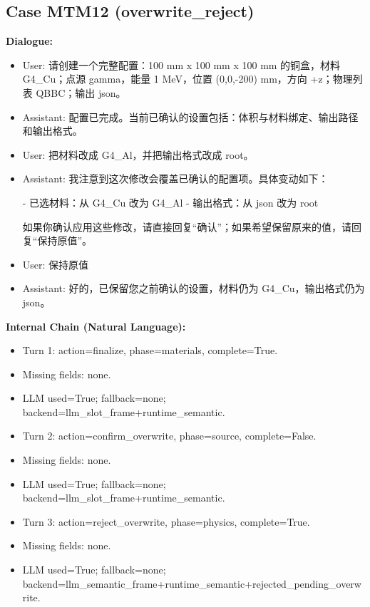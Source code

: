 \documentclass[11pt]{ctexart}
\begin{document}
\subsection{Case MTM12 (overwrite\_reject)}
\textbf{Dialogue:}
\begin{itemize}
\item User: 请创建一个完整配置：100 mm x 100 mm x 100 mm 的铜盒，材料 G4\_Cu；点源 gamma，能量 1 MeV，位置 (0,0,-200) mm，方向 +z；物理列表 QBBC；输出 json。
\item Assistant: 配置已完成。当前已确认的设置包括：体积与材料绑定、输出路径和输出格式。
\item User: 把材料改成 G4\_Al，并把输出格式改成 root。
\item Assistant: 我注意到这次修改会覆盖已确认的配置项。具体变动如下：

- 已选材料：从 G4\_Cu 改为 G4\_Al
- 输出格式：从 json 改为 root

如果你确认应用这些修改，请直接回复“确认”；如果希望保留原来的值，请回复“保持原值”。
\item User: 保持原值
\item Assistant: 好的，已保留您之前确认的设置，材料仍为 G4\_Cu，输出格式仍为 json。
\end{itemize}
\textbf{Internal Chain (Natural Language):}
\begin{itemize}
\item Turn 1: action=finalize, phase=materials, complete=True.
\item Missing fields: none.
\item LLM used=True; fallback=none; backend=llm\_slot\_frame+runtime\_semantic.
\item Turn 2: action=confirm\_overwrite, phase=source, complete=False.
\item Missing fields: none.
\item LLM used=True; fallback=none; backend=llm\_slot\_frame+runtime\_semantic.
\item Turn 3: action=reject\_overwrite, phase=physics, complete=True.
\item Missing fields: none.
\item LLM used=True; fallback=none; backend=llm\_semantic\_frame+runtime\_semantic+rejected\_pending\_overwrite.
\end{itemize}
\end{document}
